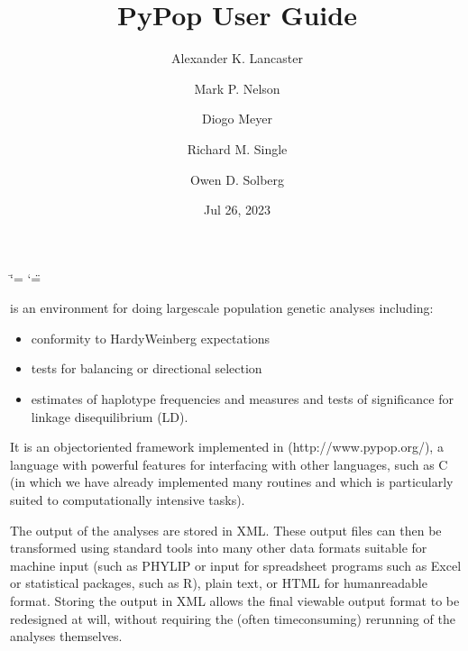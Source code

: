 \documentclass[letterpaper,10pt,english,openany,oneside]{sphinxmanual}
\title{PyPop User Guide}
\date{Jul 26, 2023}
\author{Alexander K. Lancaster\and Mark P. Nelson\and Diogo Meyer\and Richard M. Single\and Owen D. Solberg}
\begin{document}
\ifdefined\shorthandoff
  \ifnum\catcode`\=\string=\active\shorthandoff{=}\fi
  \ifnum\catcode`\"=\active{}\fi
\fi

\pagestyle{empty}
\newcommand\sphinxbackoftitlepage{\sphinxstrong{PyPop User Guide}\\ \\Copyright © 2003-2009 Regents of the University of California.\\Copyright © 2023 PyPop contributors \\ \\Permission is granted to copy, distribute and/or modify this document under the terms of the GNU Free Documentation License, Version 1.2 or any later version published by the Free Software Foundation; with no Invariant Sections no Front-Cover Texts and no Back-Cover Texts. A copy of the license is included in the License chapter.\\ \\Document release: 0.0.post2310+ga91d9e6.d20230726}\sphinxmaketitle
\pagestyle{plain}
\sphinxtableofcontents
\pagestyle{normal}
\label{\detokenize{docs/index::doc}}


\sphinxAtStartPar
{} is an environment for doing
large\sphinxhyphen{}scale population genetic analyses including:
\begin{itemize}
\item {} 
\sphinxAtStartPar
conformity to Hardy\sphinxhyphen{}Weinberg expectations

\item {} 
\sphinxAtStartPar
tests for balancing or directional selection

\item {} 
\sphinxAtStartPar
estimates of haplotype frequencies and measures and tests of
significance for linkage disequilibrium (LD).

\end{itemize}

\sphinxAtStartPar
It is an object\sphinxhyphen{}oriented framework implemented in  (http://www.pypop.org/), a language with powerful features for
interfacing with other languages, such as C (in which we have already
implemented many routines and which is particularly suited to
computationally intensive tasks).

\sphinxAtStartPar
The output of the analyses are stored in XML. These output files can
then be transformed using standard tools into many other data formats
suitable for machine input (such as PHYLIP or input for spreadsheet
programs such as Excel or statistical packages, such as R), plain
text, or HTML for human\sphinxhyphen{}readable format. Storing the output in XML
allows the final viewable output format to be redesigned at will,
without requiring the (often time\sphinxhyphen{}consuming) re\sphinxhyphen{}running of the
analyses themselves.
\end{document}
